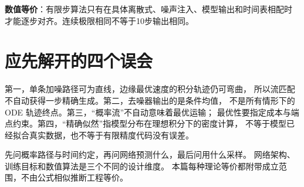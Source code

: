 \textbf{数值等价}：有限步算法只有在具体离散式、噪声注入、模型输出和时间表相配时
才能逐步对齐。连续极限相同不等于10步输出相同。

\section{应先解开的四个误会}

第一，单条加噪路径可为直线，边缘最优速度的积分轨迹仍可弯曲，
所以流匹配不自动获得一步精确生成。第二，去噪器输出的是条件均值，
不是所有情形下的 ODE 轨迹终点。第三，“概率流”不自动意味着最优运输；
最优性要指定成本与端点约束。第四，“精确似然”指模型分布在理想积分下的密度计算，
不等于模型已经拟合真实数据，也不等于有限精度代码没有误差。

\begin{theorytakeaway}
先问概率路径与时间约定，再问网络预测什么，最后问用什么采样。
网络架构、训练目标和数值算法是三个不同的设计维度。
本篇每种理论等价都附带成立范围，不由公式相似推断工程等价。
\end{theorytakeaway}
